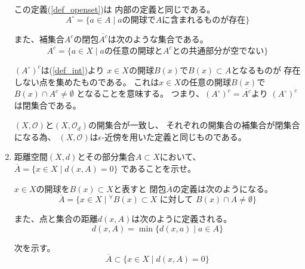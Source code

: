 \documentclass[12pt,b5paper]{ltjsarticle}
\begin{document}
\begin{enumerate}
      この定義(\ref{def_openset})は
      内部の定義と同じである。
      \begin{equation}
       A^{\circ}=\{
        a\in A \mid a\text{の開球で}A\text{に含まれるものが存在}
        \}
        \label{def_int}
      \end{equation}


      また、補集合$A^{c}$の閉包$\overline{A^{c}}$は次のような集合である。
      \begin{equation}
       \overline{A^{c}}=\{
        a\in X \mid a\text{の任意の開球と}A^{c}\text{との共通部分が空でない}\}
      \end{equation}

      $(A^{\circ})^{c}$は(\ref{def_int})より
      $x\in X$の開球$B(x)$で$B(x)\subset A$となるものが
      存在しない点を集めたものである。
      これは$x\in X$の任意の開球$B(x)$で
      $B(x)\cap A^{c}\ne\emptyset$
      となることを意味する。
      つまり、$(A^{\circ})^{c}=\overline{A^{c}}$より
      $(A^{\circ})^{c}$は閉集合である。

      $(X,\mathcal{O})$と$(X,\mathcal{O}_d)$の開集合が一致し、
      それぞれの開集合の補集合が閉集合になる為、
      $(X,\mathcal{O})$は$\epsilon$-近傍を用いた定義と同じものである。


      \hrulefill

 \item
      距離空間$(X,d)$とその部分集合$A\subset X$において、
      $\overline{A}=\{ x\in X \mid d(x,A)=0\}$
      であることを示せ。

      \dotfill

      $x\in X$の開球を$B(x) \subset X$と表すと
      閉包$\overline{A}$の定義は次のようになる。
      \begin{equation}
       \overline{A}=\{
        x\in X \mid {}^{\forall}B(x)\subset X
        \text{ に対して } B(x)\cap A \ne\emptyset
        \}
        \label{def_clo}
      \end{equation}

      また、点と集合の距離$d(x,A)$は次のように定義される。
      \begin{equation}
       d(x,A)= \min \{ d(x,a) \mid a\in A \}
      \end{equation}

      次を示す。
      \begin{equation}
       \overline{A} \subset \{ x\in X \mid d(x,A)=0\}
      \end{equation}



\end{enumerate}
\end{document}
